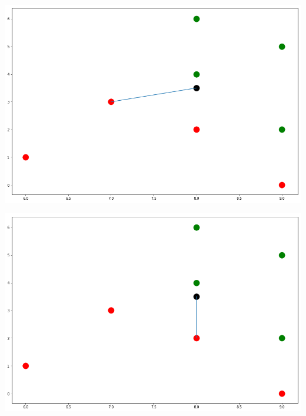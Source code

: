 \documentclass[fontsize=11pt]{scrartcl}
\newenvironment{Figure}
  {\par\medskip\noindent\minipage{\linewidth}}
  {\endminipage\par\medskip}
\begin{document}
\begin{Figure}
                    \hspace{.1\linewidth}
                    \begin{minipage}[b]{.4\linewidth}
                        \includegraphics[scale=0.2]{nn3.png}
                    \end{minipage}
                    \hspace{.1\linewidth}
                    \begin{minipage}[b]{.4\linewidth}
                        \includegraphics[scale=0.2]{nn4.png}
                    \end{minipage}
                \end{Figure}       
                       
\end{document}
